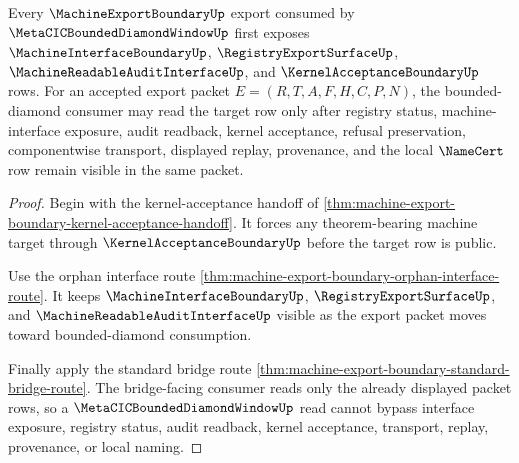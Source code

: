\begin{theorem}
\label{thm:machine-export-boundary-forward-interface}
Every $\MachineExportBoundaryUp$ export consumed by $\MetaCICBoundedDiamondWindowUp$ first exposes $\MachineInterfaceBoundaryUp$, $\RegistryExportSurfaceUp$, $\MachineReadableAuditInterfaceUp$, and $\KernelAcceptanceBoundaryUp$ rows. For an accepted export packet $E=(R,T,A,F,H,C,P,N)$, the bounded-diamond consumer may read the target row only after registry status, machine-interface exposure, audit readback, kernel acceptance, refusal preservation, componentwise transport, displayed replay, provenance, and the local $\NameCert$ row remain visible in the same packet.
\end{theorem}
\begin{proof}
Begin with the kernel-acceptance handoff of \autoref{thm:machine-export-boundary-kernel-acceptance-handoff}. It forces any theorem-bearing machine target through $\KernelAcceptanceBoundaryUp$ before the target row is public.

Use the orphan interface route \autoref{thm:machine-export-boundary-orphan-interface-route}. It keeps $\MachineInterfaceBoundaryUp$, $\RegistryExportSurfaceUp$, and $\MachineReadableAuditInterfaceUp$ visible as the export packet moves toward bounded-diamond consumption.

Finally apply the standard bridge route \autoref{thm:machine-export-boundary-standard-bridge-route}. The bridge-facing consumer reads only the already displayed packet rows, so a $\MetaCICBoundedDiamondWindowUp$ read cannot bypass interface exposure, registry status, audit readback, kernel acceptance, transport, replay, provenance, or local naming.
\end{proof}
